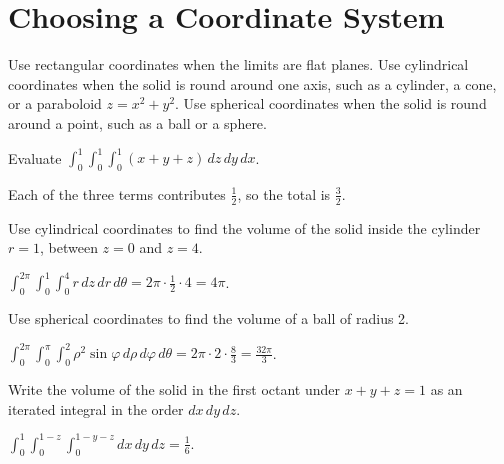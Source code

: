 \section{Choosing a Coordinate System}
Use rectangular coordinates when the limits are flat planes. Use cylindrical
coordinates when the solid is round around one axis, such as a cylinder, a
cone, or a paraboloid $z = x^2 + y^2$. Use spherical coordinates when the solid
is round around a point, such as a ball or a sphere.

\begin{Exercise}[label=triple1, title=Evaluate a box integral]
Evaluate $\displaystyle \int_0^1 \int_0^1 \int_0^1 (x + y + z)\,dz\,dy\,dx$.
\end{Exercise}
\begin{Answer}[ref=triple1]
Each of the three terms contributes $\frac{1}{2}$, so the total is $\frac{3}{2}$.
\end{Answer}

\begin{Exercise}[label=triple2, title=Volume by cylindrical coordinates]
Use cylindrical coordinates to find the volume of the solid inside the cylinder
$r = 1$, between $z = 0$ and $z = 4$.
\end{Exercise}
\begin{Answer}[ref=triple2]
$\int_0^{2\pi}\int_0^1\int_0^4 r\,dz\,dr\,d\theta = 2\pi \cdot \frac{1}{2} \cdot 4 = 4\pi$.
\end{Answer}

\begin{Exercise}[label=triple3, title=Volume of a larger ball]
Use spherical coordinates to find the volume of a ball of radius 2.
\end{Exercise}
\begin{Answer}[ref=triple3]
$\int_0^{2\pi}\int_0^{\pi}\int_0^2 \rho^2\sin\varphi\,d\rho\,d\varphi\,d\theta
= 2\pi \cdot 2 \cdot \frac{8}{3} = \frac{32\pi}{3}$.
\end{Answer}

\begin{Exercise}[label=triple4, title=Order of integration]
Write the volume of the solid in the first octant under $x + y + z = 1$ as an
iterated integral in the order $dx\,dy\,dz$.
\end{Exercise}
\begin{Answer}[ref=triple4]
$\displaystyle \int_0^1 \int_0^{1-z} \int_0^{1-y-z} dx\,dy\,dz = \frac{1}{6}$.
\end{Answer}
